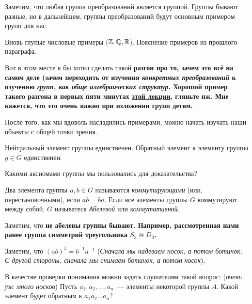 	\begin{remark}
		Заметим, что любая группа преобразований является группой. Группы бывают разные, но в дальнейшем, группы преобразований будут основным примером групп для нас. 
	\end{remark}

	\begin{example}
		Вновь глупые числовые примеры ($\mathbb{Z}, \mathbb{Q}, \mathbb{R}$). Пояснение примеров из прошлого параграфа. 
	\end{example}

	\begin{remark}
		Вот в этом месте я бы хотел сделать такой \bf{разгон} про то, зачем это всё на самом деле (зачем переходить от изучения \emph{конкретных преобразований} к изучению \emph{групп, как обще алгебраических структур}. Хороший пример такого разгона в первых пяти минутах \href{https://www.youtube.com/watch?v=NKZ_2EzHaSI}{этой лекции}, гляньте пж. Мне кажется, что это \bf{очень важно} при изложении групп детям. 
	\end{remark} 

	После того, как мы вдоволь насладились примерами, можно начать изучать наши объекты с общей точки зрения. 

	\begin{observation} 
		Нейтральный элемент группы единственен. Обратный элемент к элементу группы $g \in G$ единственен. 
	\end{observation}

	\begin{remark}
		Какими аксиомами группы мы пользовались для доказательства? 
	\end{remark}

	\begin{definition} 
		Два элемента группы $a, b \in G$ называются \emph{коммутирующими} (или, перестановочными), если $ab = ba$. Если все элементы группы $G$ коммутируют между собой, $G$ называтеся \emph{Абелевой} или \emph{коммутативной}. 
	\end{definition}

	\begin{remark}
		Заметим, что \bf{не абелевы} группы бывают. Например, рассмотренная нами ранее группа симметрий треугольника $S_{3} \cong D_{3}$.
	\end{remark}

	\begin{example}
		Заметим, что $(ab)^{1} = b^{-1}a^{-1}$ (\emph{Сначала мы надеваем носок, а потом ботинок. С другой  стороны, сначала мы снимаем ботинок, а потом носок}).

		В качестве проверки понимания можно задать слушателям такой вопрос:  (\emph{очень уж много носков}) Пусть $a_1, a_2, \ldots, a_n$~--- элементы некоторой группы $A$. Какой элемент будет обратным к $a_1 a_2 \ldots a_n$?
	\end{example}

